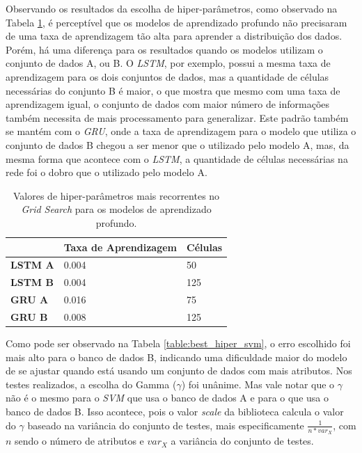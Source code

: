 Observando os resultados da escolha de hiper-parâmetros, como observado na Tabela \ref{table:best_hiper_deep}, é perceptível que os modelos de aprendizado profundo não precisaram de uma taxa de aprendizagem tão alta para aprender a distribuição dos dados. Porém, há uma diferença para os resultados quando os modelos utilizam o conjunto de dados A, ou B. O \textit{\acrshort{LSTM}}, por exemplo, possui a mesma taxa de aprendizagem para os dois conjuntos de dados, mas a quantidade de células necessárias do conjunto B é maior, o que mostra que mesmo com uma taxa de aprendizagem igual, o conjunto de dados com maior número de informações também necessita de mais processamento para generalizar. Este padrão também se mantém com o \textit{\acrshort{GRU}}, onde a taxa de aprendizagem para o modelo que utiliza o conjunto de dados B chegou a ser menor que o utilizado pelo modelo A, mas, da mesma forma que acontece com o \textit{\acrshort{LSTM}}, a quantidade de células necessárias na rede foi o dobro que o utilizado pelo modelo A.

\begin{table}[H]
    \begin{tabular*}{\linewidth}{@{\extracolsep{\fill}}lll}
    \toprule
     & 
    \multicolumn{1}{l}{\textbf{Taxa de Aprendizagem}} & 
    \multicolumn{1}{l}{\textbf{Células}} 
    \\
\midrule
\textbf{LSTM A} & 0.004 & 50\\ \midrule
\textbf{LSTM B} & 0.004 & 125 \\ \midrule
\textbf{GRU A} & 0.016 &  75 \\ \midrule
\textbf{GRU B} & 0.008 &  125 \\
    \bottomrule
    \end{tabular*}
    \label{table:best_hiper_deep}
    \caption{Valores de hiper-parâmetros mais recorrentes no \textit{Grid Search} para os modelos de aprendizado profundo.}
\end{table}

Como pode ser observado na Tabela \ref{table:best_hiper_svm}, o erro escolhido foi mais alto para o banco de dados B, indicando uma dificuldade maior do modelo de se ajustar quando está usando um conjunto de dados com mais atributos. Nos testes realizados, a escolha do Gamma (\(\gamma\)) foi unânime. Mas vale notar que o \(\gamma\) não é o mesmo para o \textit{\acrshort{SVM}} que usa o banco de dados A e para o que usa o banco de dados B. Isso acontece, pois o valor \textit{scale} da biblioteca calcula o valor do \(\gamma\) baseado na variância do conjunto de testes, mais especificamente \(\frac{1}{n * var_X}\), com \(n\) sendo o número de atributos e \(var_X\) a variância do conjunto de testes.

